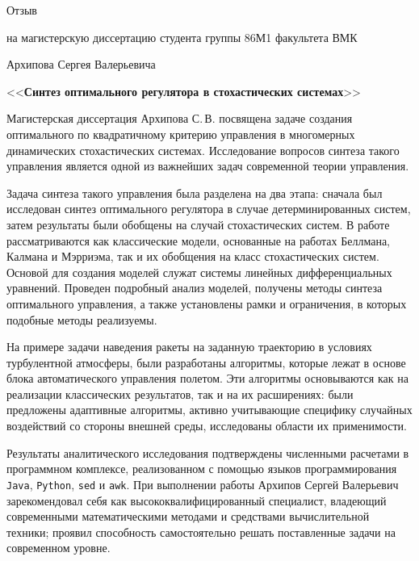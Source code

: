\documentclass[12pt,a4paper,legalpaper,pdftex]{letter}
\begin{document}
\newcommand{\underscore}[1]{\underline{\hspace*{#1cm}}}

\newcommand{\header}[1]{\begin{center}{\fontsize{20.74pt}{10pt}\selectfont #1}\end{center}}
\newcommand{\subheader}[1]{\begin{center}{\fontsize{14pt}{12pt}\selectfont\center #1}\end{center}}
\newcommand{\wtitle}[1]{\begin{center}{\fontsize{17.28pt}{14pt}\selectfont <<\textbf{#1}>>}\end{center}}

\pagestyle{empty}


\header{Отзыв}
\subheader{на магистерскую диссертацию студента группы 86М1 факультета ВМК}
\subheader{Архипова Сергея Валерьевича}

\wtitle{Синтез оптимального регулятора в стохастических системах}

Магистерская диссертация Архипова С.\,В. посвящена задаче создания оптимального по квадратичному критерию управления в многомерных динамических стохастических системах. Исследование вопросов синтеза такого управления является одной из важнейших задач современной теории управления.

Задача синтеза такого управления была разделена на два этапа: сначала был исследован синтез оптимального регулятора в случае детерминированных систем, затем результаты были обобщены на случай стохастических систем. В работе рассматриваются как классические модели, основанные на работах Беллмана, Калмана и Мэрриэма, так и их обобщения на класс стохастических систем. Основой для создания моделей служат системы линейных дифференциальных уравнений. Проведен подробный анализ моделей, получены методы синтеза оптимального управления, а также установлены рамки и ограничения, в которых подобные методы реализуемы.

На примере задачи наведения ракеты на заданную траекторию в условиях турбулентной атмосферы, были разработаны алгоритмы, которые лежат в основе блока автоматического управления полетом. Эти алгоритмы основываются как на реализации классических результатов, так и на их расширениях: были предложены адаптивные алгоритмы, активно учитывающие специфику случайных воздействий со стороны внешней среды, исследованы области их применимости.

Результаты аналитического исследования подтверждены численными расчетами в программном комплексе, реализованном с помощью языков программирования \texttt{Java}, \texttt{Python}, \texttt{sed} и \texttt{awk}.
При выполнении работы Архипов Сергей Валерьевич зарекомендовал себя как высококвалифицированный специалист, владеющий современными математическими методами и средствами вычислительной техники; проявил способность самостоятельно решать поставленные задачи на современном уровне.
\end{document}
